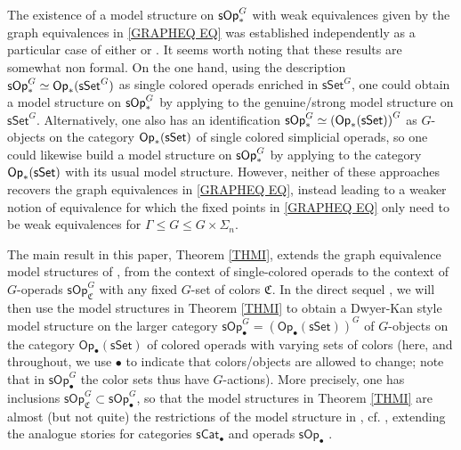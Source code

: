 \documentclass[a4paper,10pt
,draft
]{article}%
\numberwithin{equation}{section}
\numberwithin{figure}{section}
\theoremstyle{definition} %
\newcommand{\sSet}{\ensuremath{\mathsf{sSet}}}%
\newcommand{\Op}{\mathsf{Op}}%
\newcommand{\sOp}{\ensuremath{\mathsf{sOp}}}%
\newcommand{\1}{\ensuremath{\mathbbm 1}}%
\begin{document}
The existence of a model structure 
on $\mathsf{sOp}^G_{\**}$
with weak equivalences given by the graph equivalences
in \eqref{GRAPHEQ EQ}
was established independently as a particular case of either
\cite[Thm. I]{BP_geo} or \cite[Thm. 3.1]{GW18}.
It seems worth noting that these results are somewhat non formal.
On the one hand, using the description 
$\mathsf{sOp}_{\**}^G \simeq \mathsf{Op}_{\**}(\mathsf{sSet}^G)$
as single colored operads enriched in 
$\mathsf{sSet}^G$,
one could obtain a model structure
on $\mathsf{sOp}_{\**}^G$
by applying \cite[Thm. 3.2]{BM03}
to the genuine/strong model structure on $\mathsf{sSet}^G$.
Alternatively, one also has an identification
$\mathsf{sOp}_{\**}^G \simeq 
\left(\mathsf{Op}_{\**}(\mathsf{sSet})\right)^G$
as $G$-objects on the category
$\mathsf{Op}_{\**}(\mathsf{sSet})$
of single colored simplicial operads,
so one could likewise build a model structure on 
$\mathsf{sOp}_{\**}^G$
by applying \cite[Prop. 2.6]{Ste16}
to the category
$\mathsf{Op}_{\**}(\mathsf{sSet})$
with its usual model structure.
However, neither of these approaches
recovers the graph equivalences in \eqref{GRAPHEQ EQ},
instead leading to a weaker notion of equivalence for which the fixed points in \eqref{GRAPHEQ EQ}
only need to be weak equivalences for
$\Gamma \leq G \leq G \times \Sigma_n$.


The main result in this paper, 
Theorem \ref{THMI}, %
extends the graph equivalence model structures of
\cite[Thm. I]{BP_geo}, \cite[Thm. 3.1]{GW18}
from the context of single-colored operads 
to the context of $G$-operads
$\sOp^G_{\mathfrak C}$
with any fixed $G$-set of colors $\mathfrak{C}$.
In the direct sequel \cite{BP_ACOP},
we will then use the model structures in 
Theorem \ref{THMI} to obtain a Dwyer-Kan style model structure
\cite[Thm. \ref{AC-THMA}]{BP_ACOP}
on the larger category
$\sOp^G_\bullet = \left(\Op_\bullet(\sSet)\right)^G$
of $G$-objects on the category $\Op_\bullet(\sSet)$
of colored operads with varying sets of colors
(here, and throughout, we use $\bullet$ to indicate that colors/objects are allowed to change;
note that in $\sOp^G_\bullet$ the color sets
thus have $G$-actions).
%
More precisely, one has inclusions
$\sOp^G_{\mathfrak C} \subset \sOp^G_\bullet$,
so that the model structures in Theorem \ref{THMI}
are almost (but not quite)
the restrictions of the model structure in 
\cite[Thm. \ref{AC-THMA}]{BP_ACOP},
cf. \cite[Prop. \ref{AC-FIBERGLMOD PROP}]{BP_ACOP},
extending the analogue stories for categories
$\mathsf{sCat}_\bullet$
\cite{Ber07b,BM13}
and operads $\mathsf{sOp}_\bullet$
\cite{Rob11,CM13b,Cav}.
\end{document}
